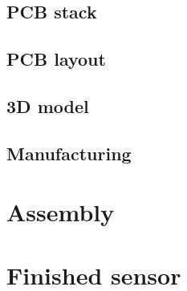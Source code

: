     \subsection{PCB stack}
    \subsection{PCB layout}
    \subsection{3D model}
    \subsection{Manufacturing}

\section{Assembly}

\section{Finished sensor}
